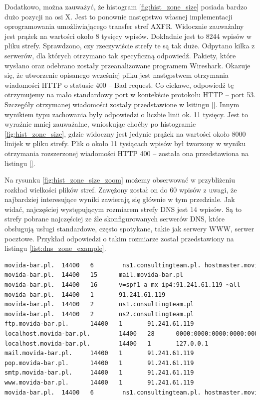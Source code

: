 Dodatkowo, można zauważyć, że histogram \ref{fig:hist_zone_size} posiada bardzo dużo pozycji na osi X. Jest to ponownie następstwo własnej implementacji oprogramowania umożliwiającego transfer stref AXFR. Widocznie zauważalny jest prążek na wartości około 8 tysięcy wpisów. Dokładnie jest to 8244 wpisów w pliku strefy. Sprawdzono, czy rzeczywiście strefy te są tak duże. Odpytano kilka z serwerów, dla których otrzymano tak specyficzną odpowiedź. Pakiety, które wysłano oraz odebrano zostały przeanalizowane programem Wireshark. Okazuje się, że utworzenie opisanego wcześniej pliku jest następstwem otrzymania wiadomości HTTP o statusie 400 -- Bad request. Co ciekawe, odpowiedź tę otrzymujemy na mało standardowy port w kontekście protokołu HTTP -- port 53. Szczegóły otrzymanej wiadomości zostały przedstawione w lsitingu \ref{}. Innym wynikiem typu zachowania były odpowiedzi o liczbie linii ok. 11 tysięcy. Jest to wyraźnie mniej zauważalne, wnioskując choćby po histogramie \ref{fig:hist_zone_size}, gdzie widoczny jest jedynie prążek na wartości około 8000 linijek w pliku strefy. Plik o około 11 tysiącach wpisów był tworzony w wyniku otrzymania rozszerzonej wiadomości HTTP 400 -- została ona przedstawiona na listingu \ref{}.

Na rysunku \ref{fig:hist_zone_size_zoom} możemy obserwować w przybliżeniu rozkład wielkości plików stref. Zawężony został on do 60 wpisów z uwagi, że najbardziej interesujące wyniki zawierają się głównie w tym przedziale. Jak widać, najczęściej występującym rozmiarem strefy DNS jest 14 wpisów. Są to strefy pobrane najczęściej ze źle skonfigurowanych serwerów DNS, które obsługują usługi standardowe, często spotykane, takie jak serwery WWW, serwer pocztowe. Przykład odpowiedzi o takim rozmiarze został przedstawiony na listingu \ref{list:dns_zone_example}.  

\begin{lstlisting}[label={list:dns_zone_example},captionpos=b,caption=Przykładowy plik strefy DNS.,language=bash]
movida-bar.pl.  14400   6        ns1.consultingteam.pl. hostmaster.movida-bar.pl. 1952801133 3222735464 1869837421 1634956389 1925188727
movida-bar.pl.  14400   15      mail.movida-bar.pl
movida-bar.pl.  14400   16      v=spf1 a mx ip4:91.241.61.119 ~all
movida-bar.pl.  14400   1       91.241.61.119
movida-bar.pl.  14400   2       ns1.consultingteam.pl
movida-bar.pl.  14400   2       ns2.consultingteam.pl
ftp.movida-bar.pl.      14400   1       91.241.61.119
localhost.movida-bar.pl.        14400   28      0000:0000:0000:0000:0000:0000:0000:0001
localhost.movida-bar.pl.        14400   1       127.0.0.1
mail.movida-bar.pl.     14400   1       91.241.61.119
pop.movida-bar.pl.      14400   1       91.241.61.119
smtp.movida-bar.pl.     14400   1       91.241.61.119
www.movida-bar.pl.      14400   1       91.241.61.119
movida-bar.pl.  14400   6        ns1.consultingteam.pl. hostmaster.movida-bar.pl. 2013010900 14400 3600 1209600 86400
\end{lstlisting}

